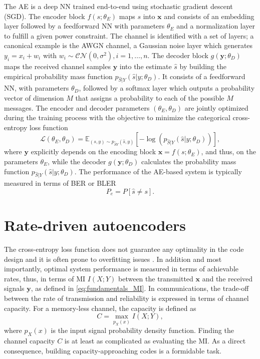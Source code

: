 The AE is a deep NN trained end-to-end using stochastic gradient descent (SGD). The encoder block $f(s;\theta_E)$ maps $s$ into $\mathbf{x}$ and consists of an embedding layer followed by a feedforward NN with parameters $\theta_E$ and a normalization layer to fulfill a given power constraint. The channel is identified with a set of layers; a canonical example is the AWGN channel, a Gaussian noise layer which generates $y_i = x_i+w_i$ with $w_i\sim \mathcal{CN}(0,\sigma^2), i=1,\dots,n$. The decoder block $g(\mathbf{y};\theta_D)$ maps the received channel samples $\mathbf{y}$ into the estimate $\hat{s}$ by building the empirical probability mass function $p_{\hat{S}|Y}(\hat{s}|y;\theta_D)$. It consists of a feedforward NN, with parameters $\theta_D$, followed by a softmax layer which outputs a probability vector of dimension $M$ that assigns a probability to each of the possible $M$ messages. The encoder and decoder parameters $(\theta_E, \theta_D)$ are jointly optimized during the training process with the objective to minimize the categorical cross-entropy loss function
\begin{equation}
\label{eq:AE_CE}
\mathcal{L}(\theta_E, \theta_D) = \mathbb{E}_{(s,y)\sim p_{\hat{S}Y}(\hat{s},y)}[-\log(p_{\hat{S}|Y}(\hat{s}|y;\theta_D))],
\end{equation}
where $\mathbf{y}$ explicitly depends on the encoding block $\mathbf{x} = f(s;\theta_E)$, and thus, on the parameters $\theta_E$, while the decoder $g(\mathbf{y};\theta_D)$ calculates the probability mass function $p_{\hat{S}|Y}(\hat{s}|y;\theta_D)$.
The performance of the AE-based system is typically measured in terms of BER or BLER
\begin{equation}
\label{eq:AE_BLER}
P_e =  {P[\hat{s}\neq s]}.
\end{equation}

\section{Rate-driven autoencoders}
\label{sec:cacao}
The cross-entropy loss function does not guarantee any optimality in the code design and it is often prone to overfitting issues \cite{Tishby2017, Soatto2018}. In addition and most importantly, optimal system performance is measured in terms of achievable rates, thus, in terms of MI $I(X;Y)$ between the transmitted $\mathbf{x}$ and the received signals $\mathbf{y}$, as defined in \eqref{eq:fundamentals_MI}.
In communications, the trade-off between the rate of transmission and reliability is expressed in terms of channel capacity. For a memory-less channel, the capacity is defined as
\begin{equation}
\label{eq:AE_capacity}
C = \max_{p_X(x)} I(X;Y),
\end{equation}
where $p_X(x)$ is the input signal probability density function. Finding the channel capacity $C$ is at least as complicated as evaluating the MI. As a direct consequence, building capacity-approaching codes is a formidable task. 

